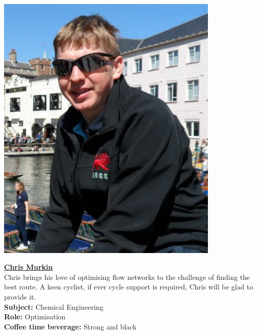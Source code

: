 \documentclass[a4paper,11pt]{article}  %
\begin{document}
\noindent \begin{minipage}{0.4\textwidth}
  \includegraphics[width=0.8\textwidth]{ChrisProfile.jpg}
\end{minipage}
\hfill
\begin{minipage}{0.6\textwidth}
  {\large \textbf{\underline{Chris Murkin}}}\\

  Chris brings his love of optimising flow networks to the challenge
  of finding the best route. A keen cyclist, if ever cycle support is
  required, Chris will be glad to provide it.\\

  \textbf{Subject:} Chemical Engineering\\
  \textbf{Role:} Optimisation\\
  \textbf{Coffee time beverage:} Strong and black
\end{minipage}

\bigskip
\end{document}
